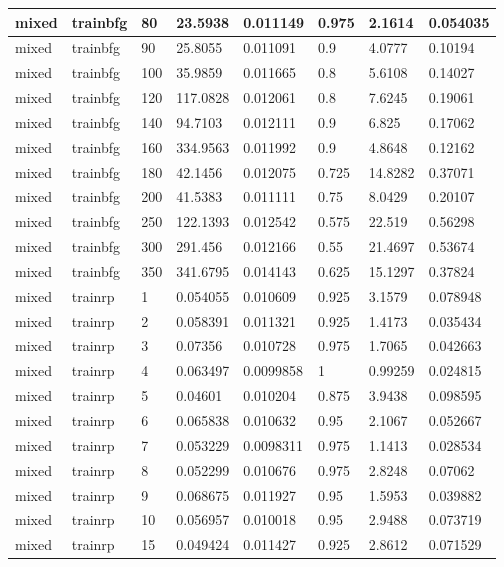 \begin{longtable}{llllllll}
mixed & trainbfg & 80 & 23.5938 & 0.011149 & 0.975 & 2.1614 & 0.054035 \\ \hline 
mixed & trainbfg & 90 & 25.8055 & 0.011091 & 0.9 & 4.0777 & 0.10194 \\ \hline 
mixed & trainbfg & 100 & 35.9859 & 0.011665 & 0.8 & 5.6108 & 0.14027 \\ \hline 
mixed & trainbfg & 120 & 117.0828 & 0.012061 & 0.8 & 7.6245 & 0.19061 \\ \hline 
mixed & trainbfg & 140 & 94.7103 & 0.012111 & 0.9 & 6.825 & 0.17062 \\ \hline 
mixed & trainbfg & 160 & 334.9563 & 0.011992 & 0.9 & 4.8648 & 0.12162 \\ \hline 
mixed & trainbfg & 180 & 42.1456 & 0.012075 & 0.725 & 14.8282 & 0.37071 \\ \hline 
mixed & trainbfg & 200 & 41.5383 & 0.011111 & 0.75 & 8.0429 & 0.20107 \\ \hline 
mixed & trainbfg & 250 & 122.1393 & 0.012542 & 0.575 & 22.519 & 0.56298 \\ \hline 
mixed & trainbfg & 300 & 291.456 & 0.012166 & 0.55 & 21.4697 & 0.53674 \\ \hline 
mixed & trainbfg & 350 & 341.6795 & 0.014143 & 0.625 & 15.1297 & 0.37824 \\ \hline 
mixed & trainrp & 1 & 0.054055 & 0.010609 & 0.925 & 3.1579 & 0.078948 \\ \hline 
mixed & trainrp & 2 & 0.058391 & 0.011321 & 0.925 & 1.4173 & 0.035434 \\ \hline 
mixed & trainrp & 3 & 0.07356 & 0.010728 & 0.975 & 1.7065 & 0.042663 \\ \hline 
mixed & trainrp & 4 & 0.063497 & 0.0099858 & 1 & 0.99259 & 0.024815 \\ \hline 
mixed & trainrp & 5 & 0.04601 & 0.010204 & 0.875 & 3.9438 & 0.098595 \\ \hline 
mixed & trainrp & 6 & 0.065838 & 0.010632 & 0.95 & 2.1067 & 0.052667 \\ \hline 
mixed & trainrp & 7 & 0.053229 & 0.0098311 & 0.975 & 1.1413 & 0.028534 \\ \hline 
mixed & trainrp & 8 & 0.052299 & 0.010676 & 0.975 & 2.8248 & 0.07062 \\ \hline 
mixed & trainrp & 9 & 0.068675 & 0.011927 & 0.95 & 1.5953 & 0.039882 \\ \hline 
mixed & trainrp & 10 & 0.056957 & 0.010018 & 0.95 & 2.9488 & 0.073719 \\ \hline 
mixed & trainrp & 15 & 0.049424 & 0.011427 & 0.925 & 2.8612 & 0.071529 \\ \hline 

\end{longtable}
